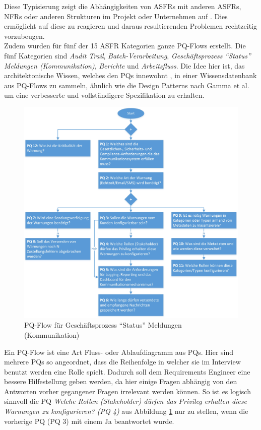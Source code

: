 Diese Typisierung zeigt die Abh\"angigkeiten von ASFRs mit anderen ASFRs, NFRs oder anderen Strukturen im Projekt oder Unternehmen auf \cite{Ros02}. Dies erm\"oglicht auf diese zu reagieren und daraus resultierenden Problemen rechtzeitig vorzubeugen. \\

Zudem wurden f\"ur f\"unf der 15 ASFR Kategorien ganze PQ-Flows erstellt. Die f\"unf Kategorien sind \textit{Audit Trail}, \textit{Batch-Verarbeitung}, \textit{Gesch\"aftsprozess ``Status'' Meldungen (Kommunikation)}, \textit{Berichte} und \textit{Arbeitsfluss}. Die Idee hier ist, das architektonische Wissen, welches den PQs innewohnt \cite{Ros02}, in einer Wissensdatenbank aus PQ-Flows zu sammeln, \"ahnlich wie die Design Patterns nach Gamma et al. \cite{Ros03} um eine verbesserte und vollst\"andigere Spezifikation zu erhalten. \\

\begin{figure}[h]
	\centering
	\includegraphics[scale=0.45]{pqflow_communication.jpg} 
	\caption{PQ-Flow f\"ur Gesch\"aftsprozess ``Status'' Meldungen (Kommunikation) \cite{Ros01}}\label{fig_pqflow_communication}
\end{figure}

Ein PQ-Flow ist eine Art Fluss- oder Ablaufdiagramm aus PQs. Hier sind mehrere PQs so angeordnet, dass die Reihenfolge in welcher sie im Interview benutzt werden eine Rolle spielt. Dadurch soll dem Requirements Engineer eine bessere Hilfestellung geben werden, da hier einige Fragen abh\"angig von den Antworten vorher gegangener Fragen irrelevant werden k\"onnen. So ist es logisch sinnvoll die PQ \textit{Welche Rollen (Stakeholder) d\"urfen das Privileg erhalten diese Warnungen zu konfigurieren? (PQ 4)} aus Abbildung \ref{fig_pqflow_communication} nur zu stellen, wenn die vorherige PQ (PQ 3) mit einem Ja beantwortet wurde. \\

